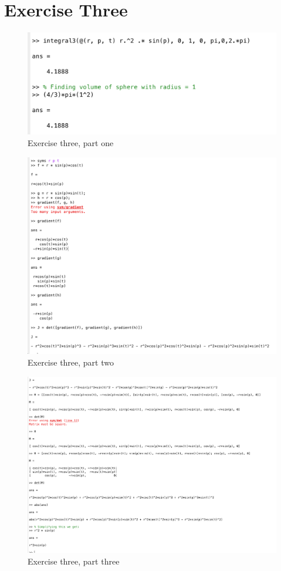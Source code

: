 \documentclass[11pt]{article}
\begin{document}
\section*{Exercise Three}
\begin{figure}[H]
	\includegraphics[width=\textwidth]{3-1}
	\caption*{Exercise three, part one}
\end{figure}
\begin{figure}[H]
	\includegraphics[width=\textwidth]{3-2}
	\caption*{Exercise three, part two}
\end{figure}
\begin{figure}[H]
	\includegraphics[width=\textwidth]{3-3}
	\caption*{Exercise three, part three}
\end{figure}
\end{document}
